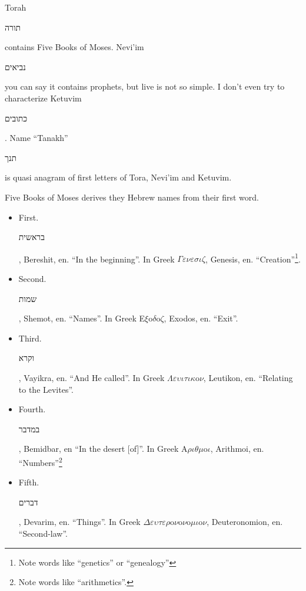 \documentclass[a4paper,11pt]{article}
\begin{document}
Torah \begin{hebrew} תורה \end{hebrew} contains Five Books of Moses. Nevi'im
\begin{hebrew} נביאים \end{hebrew} you can say it contains
prophets, but live is not so simple. I don't even try to characterize
Ketuvim \begin{hebrew} כתובים \end{hebrew}. Name ``Tanakh''
\begin{hebrew} תנך \end{hebrew} is quasi anagram of first letters of Tora,
Nevi'im and Ketuvim.

Five Books of Moses derives they Hebrew names from their first word.
\begin{itemize}

\item First. \begin{hebrew} בראשית \end{hebrew}, Bereshit, en. ``In the beginning''.
  In Greek $\Gamma \varepsilon \nu \varepsilon \sigma \iota \zeta$, Genesis, en. ``Creation''\footnote{Note words
    like ``genetics'' or ``genealogy''}.

\item Second. \begin{hebrew} שמות \end{hebrew}, Shemot, en. ``Names''. In Greek
  E$\xi$o$\delta$o$\zeta$, Exodos, en. ``Exit''.

\item Third. \begin{hebrew} וקרא \end{hebrew}, Vayikra, en. ``And He called''. In
  Greek $\Lambda \varepsilon \upsilon \iota \tau \iota \kappa$o$\nu$, Leutikon, en. ``Relating to the Levites''.

\item Fourth. \begin{hebrew} במדבר \end{hebrew}, Bemidbar, en ``In the desert
  [of]''. In Greek A$\rho \iota \theta \mu$o$\iota$, Arithmoi, en. ``Numbers''\footnote{Note
    words like ``arithmetics''.}

\item Fifth. \begin{hebrew} דברים \end{hebrew}, Devarim, en. ``Things''. In Greek
  $\Delta \varepsilon \upsilon \tau \varepsilon \rho$o$\nu$o$\nu$o$\mu \iota$o$\nu$, Deuteronomion, en. ``Second-law''.

\end{itemize}
\end{document}
